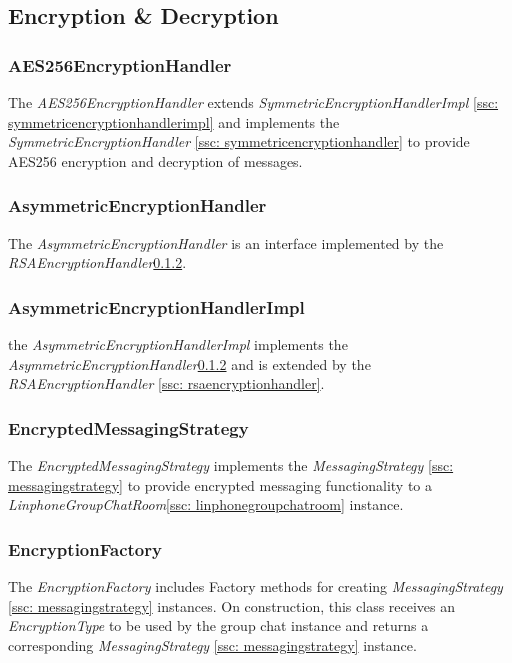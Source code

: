 \documentclass[11pt]{article}
\begin{document}
\subsection{Encryption \& Decryption}

\subsubsection{AES256EncryptionHandler}\label{ssc: aes256encryptionhandler}
The \textit{AES256EncryptionHandler} extends \textit{SymmetricEncryptionHandlerImpl} \ref{ssc: symmetricencryptionhandlerimpl} and implements the \textit{SymmetricEncryptionHandler} \ref{ssc: symmetricencryptionhandler} to provide AES256 encryption and decryption of messages. 
\subsubsection{AsymmetricEncryptionHandler}\label{ssc: asymmetricencryptionhandler}
The \textit{AsymmetricEncryptionHandler} is an interface implemented by the \textit{RSAEncryptionHandler}\ref{ssc: asymmetricencryptionhandler}.
\subsubsection{AsymmetricEncryptionHandlerImpl}\label{ssc: asymmetricencryptionhandlerimpl}
the \textit{AsymmetricEncryptionHandlerImpl} implements the \textit{AsymmetricEncryptionHandler}\ref{ssc: asymmetricencryptionhandler} and is extended by the \textit{RSAEncryptionHandler} \ref{ssc: rsaencryptionhandler}.
\subsubsection{EncryptedMessagingStrategy}\label{encryptedmessaginstrategy}
The \textit{EncryptedMessagingStrategy} implements the \textit{MessagingStrategy} \ref{ssc: messagingstrategy} to provide encrypted messaging functionality to a \textit{LinphoneGroupChatRoom}\ref{ssc: linphonegroupchatroom} instance.
\subsubsection{EncryptionFactory}\label{ssc: encryptionfactory}
The \textit{EncryptionFactory} includes Factory methods for creating \textit{MessagingStrategy} \ref{ssc: messagingstrategy} instances. On construction, this class receives an \textit{EncryptionType} to be used by the group chat instance and returns a corresponding \textit{MessagingStrategy} \ref{ssc: messagingstrategy} instance.
\end{document}
